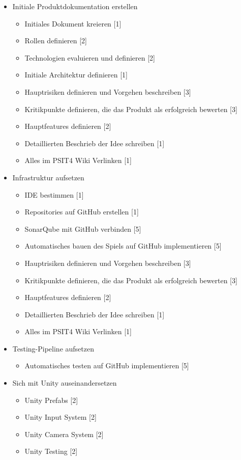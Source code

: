 \documentclass[../main.tex]{subfiles}
\begin{document}
	\begin{itemize}
		\item Initiale Produktdokumentation erstellen
		\begin{itemize}
			\item Initiales Dokument kreieren [1]
			\item Rollen definieren [2]
			\item Technologien evaluieren und definieren [2]
			\item Initiale Architektur definieren [1]
			\item Hauptrisiken definieren und Vorgehen beschreiben [3]
			\item Kritikpunkte definieren, die das Produkt als erfolgreich bewerten [3]
			\item Hauptfeatures definieren [2]
			\item Detaillierten Beschrieb der Idee schreiben [1]
			\item Alles im PSIT4 Wiki Verlinken [1]
		\end{itemize} 
		\item Infrastruktur aufsetzen
		\begin{itemize}
			\item IDE bestimmen [1]
			\item Repositories auf GitHub erstellen [1]
			\item SonarQube mit GitHub verbinden [5]
			\item Automatisches bauen des Spiels auf GitHub implementieren [5]
			\item Hauptrisiken definieren und Vorgehen beschreiben [3]
			\item Kritikpunkte definieren, die das Produkt als erfolgreich bewerten [3]
			\item Hauptfeatures definieren [2]
			\item Detaillierten Beschrieb der Idee schreiben [1]
			\item Alles im PSIT4 Wiki Verlinken [1]
		\end{itemize} 
		\item Testing-Pipeline aufsetzen
		\begin{itemize}
			\item Automatisches testen auf GitHub implementieren [5]
		\end{itemize}
		\item Sich mit Unity auseinandersetzen
		\begin{itemize}
			\item Unity Prefabs [2]
			\item Unity Input System [2]
			\item Unity Camera System [2]
			\item Unity Testing [2]
		\end{itemize}
	\end{itemize} 
\end{document}
